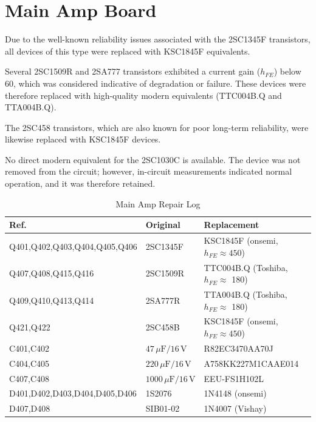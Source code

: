 \documentclass[]{article}
\begin{document}
\section{Main Amp Board}

Due to the well-known reliability issues associated with the 2SC1345F transistors, all devices of this type were replaced with KSC1845F equivalents.

Several 2SC1509R and 2SA777 transistors exhibited a current gain ($h_{FE}$) below 60, which was considered indicative of degradation or failure. These devices were therefore replaced with high-quality modern equivalents (TTC004B.Q and TTA004B.Q).

The 2SC458 transistors, which are also known for poor long-term reliability, were likewise replaced with KSC1845F devices.

No direct modern equivalent for the 2SC1030C is available. The device was not removed from the circuit; however, in-circuit measurements indicated normal operation, and it was therefore retained.

\begin{table}[H]
	\centering
	\caption{Main Amp Repair Log}
	\label{tab:main_amp_log}
	\begin{tabular}{|l|l|l|}
		\hline
		\textbf{Ref.} & \textbf{Original} & \textbf{Replacement} \\
		\hline
		Q401,Q402,Q403,Q404,Q405,Q406 & 2SC1345F & KSC1845F (onsemi, $h_{FE} \approx 450$) \\
        \hline
        Q407,Q408,Q415,Q416 & 2SC1509R & TTC004B.Q (Toshiba, $h_{FE} \approx$ 180) \\
        \hline
        Q409,Q410,Q413,Q414 & 2SA777R & TTA004B.Q (Toshiba, $h_{FE} \approx$ 180)\\
        \hline
        Q421,Q422 & 2SC458B & KSC1845F (onsemi, $h_{FE} \approx 450$)\\
        \hline
        C401,C402 & $47\,\mu\mathrm{F} / 16\,\mathrm{V}$ & R82EC3470AA70J  \\
        \hline
        C404,C405 & $220\,\mu\mathrm{F} / 16\,\mathrm{V}$  & A758KK227M1CAAE014 \\
        \hline
        C407,C408 & $1000\,\mu\mathrm{F} / 16\,\mathrm{V}$ & EEU-FS1H102L \\
        \hline
        D401,D402,D403,D404,D405,D406 & 1S2076 & 1N4148 (onsemi) \\
        \hline
        D407,D408 & SIB01-02 & 1N4007 (Vishay) \\
        \hline
	\end{tabular}
\end{table}
\end{document}
